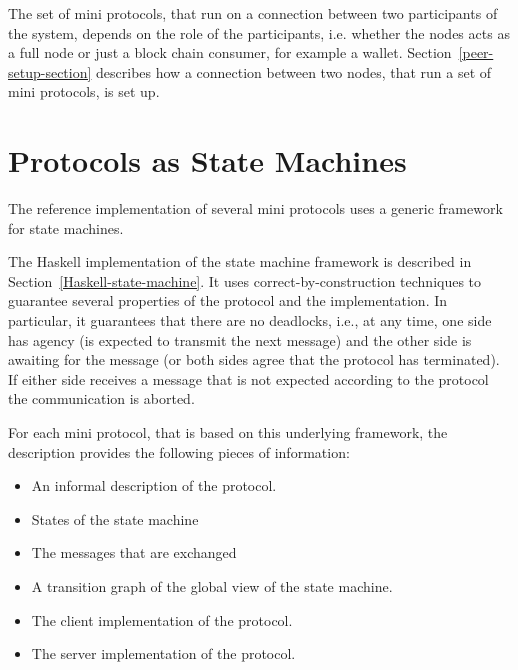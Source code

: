 \documentclass{report}
\theoremstyle{definition}{
  \newtheorem{lemma}{Lemma}[section] %
  \newtheorem{definition}[lemma]{Definition}
}
\theoremstyle{theorem}{
  \newtheorem{invariant}[lemma]{Invariant}
  \newtheorem{proofobligation}[lemma]{Proof Obligation}
}
\numberwithin{equation}{lemma}
\begin{document}
The set of mini protocols, that run on a connection between two participants of the system,
depends on the role of the participants, i.e. whether the nodes acts as a full node or just
a block chain consumer, for example a wallet.
Section~\ref{peer-setup-section} describes how a connection between two nodes,
that run a set of mini protocols, is set up.

\section{Protocols as State Machines}
The reference implementation of several mini protocols uses a generic framework
for state machines.

The Haskell implementation of the state machine framework is described in
Section~\ref{Haskell-state-machine}. It uses correct-by-construction
techniques to guarantee
several properties of the protocol and the implementation.
In particular, it guarantees that there are no deadlocks, i.e., at any time, one side has agency
(is expected to transmit the next message) and the other side is awaiting for
the message (or both sides agree that the protocol has terminated).
If either side receives a message that is not expected according to the protocol
the communication is aborted.

For each mini protocol, that is based on this underlying framework, the description provides the
following pieces of information:

\begin{itemize}
\item An informal description of the protocol.
\item States of the state machine
\item The messages that are exchanged
\item A transition graph of the global view of the state machine.
\item The client implementation of the protocol.
\item The server implementation of the protocol.
\end{itemize}
\end{document}

